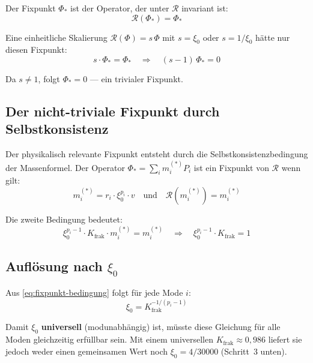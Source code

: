 Der Fixpunkt $\Phi_*$ ist der Operator, der unter $\mathcal{R}$
invariant ist:
\begin{equation}
  \mathcal{R}(\Phi_*) = \Phi_*
  \label{eq:fixpunkt}
\end{equation}

Eine einheitliche Skalierung $\mathcal{R}(\Phi) = s\,\Phi$ mit
$s = \xi_0$ oder $s = 1/\xi_0$ hätte nur diesen Fixpunkt:
\begin{equation}
  s \cdot \Phi_* = \Phi_*
  \quad \Rightarrow \quad
  (s - 1)\,\Phi_* = 0
\end{equation}

Da $s \neq 1$, folgt $\Phi_* = 0$ — ein trivialer Fixpunkt.

\subsection{Der nicht-triviale Fixpunkt durch Selbstkonsistenz}

Der physikalisch relevante Fixpunkt entsteht durch die
Selbstkonsistenzbedingung der Massenformel. Der Operator
$\Phi_* = \sum_i m_i^{(*)} P_i$ ist ein Fixpunkt von $\mathcal{R}$
wenn gilt:
\begin{equation}
  m_i^{(*)} = r_i \cdot \xi_0^{p_i} \cdot v
  \quad \text{und} \quad
  \mathcal{R}(m_i^{(*)}) = m_i^{(*)}
  \label{eq:selbstkonsistenz}
\end{equation}

Die zweite Bedingung bedeutet:
\begin{equation}
  \xi_0^{p_i - 1} \cdot K_{\text{frak}} \cdot m_i^{(*)}
  = m_i^{(*)}
  \quad \Rightarrow \quad
  \xi_0^{p_i - 1} \cdot K_{\text{frak}} = 1
  \label{eq:fixpunkt-bedingung}
\end{equation}

\subsection{Auflösung nach \texorpdfstring{$\xi_0$}{xi0}}

Aus \eqref{eq:fixpunkt-bedingung} folgt für jede Mode $i$:
\begin{equation}
  \xi_0 = K_{\text{frak}}^{-1/(p_i-1)}
  \label{eq:xi0-aus-fixpunkt}
\end{equation}

Damit $\xi_0$ \textbf{universell} (modunabhängig) ist, müsste diese
Gleichung für alle Moden gleichzeitig erfüllbar sein. Mit einem
universellen $K_{\text{frak}} \approx 0{,}986$ liefert sie jedoch
weder einen gemeinsamen Wert noch $\xi_0 = 4/30000$ (Schritt~3 unten).

